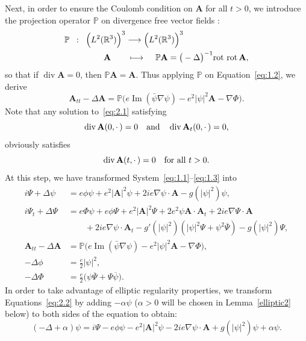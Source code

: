 \documentclass[10pt]{amsart}
\theoremstyle{definition}\newtheorem{defi}[theo]{Definition}\newtheorem{rema}[theo]{Remark}\newtheorem{exam}[theo]{Example}\newtheorem{exem}[theo]{Example}\newtheorem{nota}[theo]{Notation}
\newcommand{\BA}{\mathbf{A}}
\newcommand{\R}{\mathbb{R}}
\DeclareMathOperator{\IM}{Im}
\DeclareMathOperator{\Div}{div}
\begin{document}
Next, in order to ensure the Coulomb condition on $\BA$ for all $t>0$, we introduce the projection operator ${\mathbb P}$ on divergence free vector fields :
\begin{align*}
{\mathbb P} \;\; : \;\; \Big(L^2(&\R^3)\Big)^3 \longrightarrow \Big(L^2(\R^3)\Big)^3\\
&\BA\hspace{7mm}\longmapsto \hspace{4mm} {\mathbb P}\BA= \big(-\Delta\big)^{-1} \text{rot rot} \, \BA,
\end{align*}
so that if $\Div\BA=0$, then ${\mathbb P}\BA =\BA$. Thus applying ${\mathbb P}$ on Equation~\eqref{eq:1.2}, we derive
\begin{equation}\label{eq:2.1}
\BA_{tt}-\Delta \BA = {\mathbb P} \Big(e \IM (\bar{\psi} \nabla \psi)-e^2|\psi|^2 \BA -\nabla \Phi \Big).
\end{equation}
Note that any solution to~\eqref{eq:2.1} satisfying
\[
\Div\BA(0,{\cdot\,})=0 \quad \hbox{and} \quad
\Div\BA_t (0,{\cdot\,})=0,
\]
obviously satisfies
\[
\Div\BA(t,{\cdot\,})=0 \quad \hbox{for all} \ t>0.
\]
At this step, we have transformed System~\eqref{eq:1.1}--\eqref{eq:1.3} into
\begin{align}
i\Psi +\Delta \psi &= e\phi \psi +e^2 |\BA|^2 \psi + 2 ie \nabla \psi\cdot \BA -g(|\psi|^2)\psi, \label{eq:2.2}
\\
i\Psi_t +\Delta \Psi &= e \Phi \psi +e \phi \Psi +e^2 |\BA|^2 \Psi + 2e^2 \psi \BA \cdot \BA_t +2i e \nabla \Psi \cdot \BA \label{eq:2.3} \\
\nonumber& \qquad  +2i e \nabla \psi \cdot \BA_t -g'(|\psi|^2)(|\psi|^2\Psi+\psi^2\overline{\Psi}) - g(|\psi|^2)\Psi,
\\
\BA_{tt}-\Delta \BA &={\mathbb P} \Big(e \IM (\bar{\psi} \nabla \psi)-e^2|\psi|^2 \BA -\nabla \Phi \Big),\label{eq:2.4}
\\
-\Delta \phi &=\frac{e}{2} |\psi|^2, \label{eq:2.5}
\\
-\Delta \Phi &=\frac{e}{2} \big(\psi \overline{\Psi}+\Psi \overline{\psi}\big).\label{eq:2.6}
\end{align}
In order to take advantage of elliptic regularity properties, we transform Equations~\eqref{eq:2.2} by adding $-\alpha \psi$ ($\alpha>0$ will be chosen in Lemma~\ref{elliptic2} below) to both sides of the equation to obtain:
\begin{equation}\label{eq:2.7}
(-\Delta +\alpha)\psi = i \Psi -e\phi \psi -e^2 |\BA|^2 \psi - 2 ie \nabla \psi\cdot \BA +g(|\psi|^2)\psi+\alpha \psi.
\end{equation}
\end{document}
